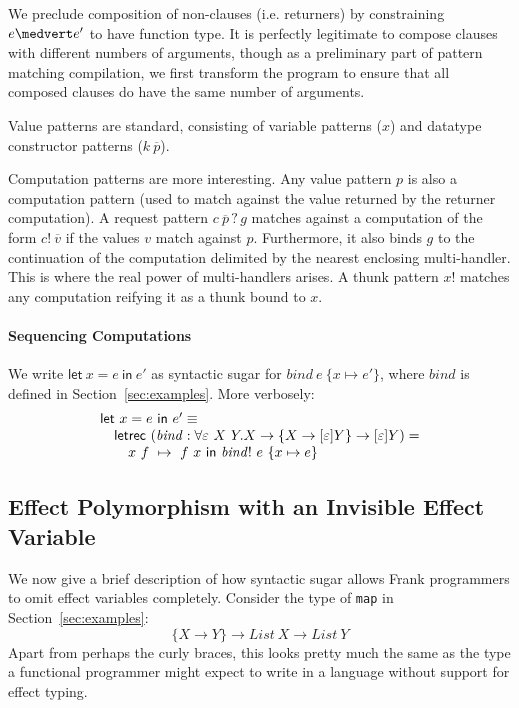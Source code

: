 \documentclass[preprint]{sigplanconf}
\makeatletter
\newcommand{\many}{\overline}
\newcommand{\bstack}{\begin{array}[t]{@{}l@{}}}
\newcommand{\estack}{\end{array}}
\newcommand{\effbox}[1]{[#1]}
\newcommand{\key}[1]{\mathsf{#1}}
\newcommand{\var}{\mathit}
\newcommand{\handleSymbol}{\mathbin{?}}
\newcommand{\handle}[2]{{#1} \handleSymbol {#2}}
\newcommand{\thunk}[1]{\{{#1}\}}
\newcommand{\force}[1]{{#1}!}
\makeatother
\begin{document}
We preclude composition of non-clauses (i.e. returners) by
constraining $e \medvert e'$ to have function type.
%
It is perfectly legitimate to compose clauses with different numbers
of arguments, though as a preliminary part of pattern matching
compilation, we first transform the program to ensure that all
composed clauses do have the same number of arguments.

Value patterns are standard, consisting of variable patterns ($x$) and
datatype constructor patterns ($k~\many{p}$).

Computation patterns are more interesting. Any value pattern $p$ is
also a computation pattern (used to match against the value returned
by the returner computation).
%
A request pattern $\handle{c~\many{p}}{g}$ matches against a
computation of the form $\force{c}~\many{v}$ if the values $v$ match
against $p$. Furthermore, it also binds $g$ to the continuation of the
computation delimited by the nearest enclosing multi-handler. This is
where the real power of multi-handlers arises. A thunk pattern
$\force{x}$ matches any computation reifying it as a thunk bound to
$x$.


\paragraph{Sequencing Computations}
We write $\key{let}~x=e~\key{in}~e'$ as syntactic sugar for
$\var{bind}~e~\thunk{x \mapsto e'}$, where $\var{bind}$ is defined in
Section~\ref{sec:examples}. More verbosely:
%
\[
\bstack
\key{let}~x=e~\key{in}~e' \equiv \\
\quad \key{letrec}~
  (\var{bind} :
    \forall \varepsilon~X~Y.
       X \to \thunk{X \to \effbox{\varepsilon}Y} \to \effbox{\varepsilon}Y) = \\
  \qquad x~f~\mapsto~f~x~\key{in}~\force{\var{bind}}~e~\thunk{x \mapsto e}
\estack
\]

\subsection{Effect Polymorphism with an Invisible Effect Variable}

We now give a brief description of how syntactic sugar allows Frank
programmers to omit effect variables completely.
%
Consider the type of \verb!map! in Section~\ref{sec:examples}:
\[
\thunk{X \to Y} \to \var{List~X} \to \var{List~Y}
\]
Apart from perhaps the curly braces, this looks pretty much the same
as the type a functional programmer might expect to write in a
language without support for effect typing.
\end{document}
